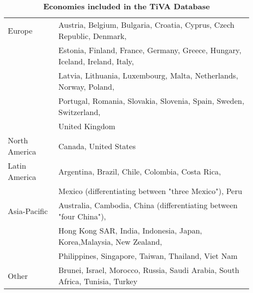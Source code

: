 \documentclass[11pt,a4paper]{article}
\begin{document}
\begin{table}[!h]
\begin{threeparttable}
\centering
\centering
\caption{\small{\textbf{Economies included in the TiVA Database}}}
\small
\begin{tabular}{ll}
\hline\hline
Europe & Austria, Belgium, Bulgaria, Croatia, Cyprus, Czech Republic, Denmark,\\
& Estonia, Finland, France, Germany, Greece, Hungary, Iceland, Ireland, Italy,\\
& Latvia, Lithuania, Luxembourg, Malta, Netherlands, Norway, Poland,\\
&Portugal, Romania, Slovakia, Slovenia, Spain, Sweden, Switzerland,\\
& United Kingdom\\
North  America& Canada, United States\\
Latin America & Argentina, Brazil, Chile, Colombia, Costa Rica, \\ 
&Mexico (differentiating between "three Mexico"), Peru\\
Asia-Pacific & Australia, Cambodia, China (differentiating between "four China"), \\
& Hong Kong SAR, India, Indonesia, Japan, Korea,Malaysia, New Zealand,\\
& Philippines, Singapore, Taiwan, Thailand, Viet Nam\\
Other & Brunei, Israel, Morocco, Russia, Saudi Arabia, South Africa, Tunisia, Turkey\\
\hline\hline
\end{tabular} 
\label{tab:tiva}
\end{threeparttable}
\end{table} 
\end{document}
